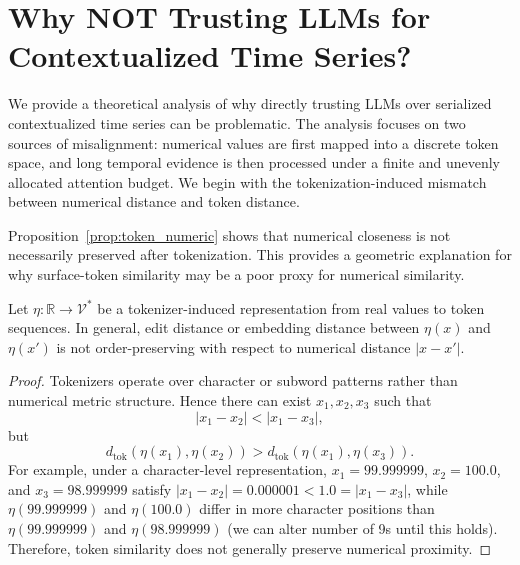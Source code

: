 \section{Why NOT Trusting LLMs for Contextualized Time Series?}
\label{ap:analysis}

We provide a theoretical analysis of why directly trusting LLMs over serialized
contextualized time series can be problematic. The analysis focuses on two
sources of misalignment: numerical values are first mapped into a discrete token
space, and long temporal evidence is then processed under a finite and unevenly
allocated attention budget. We begin with the tokenization-induced mismatch
between numerical distance and token distance.

Proposition~\ref{prop:token_numeric} shows that numerical closeness is not
necessarily preserved after tokenization. This provides a geometric explanation
for why surface-token similarity may be a poor proxy for numerical similarity.

\begin{proposition}
\label{prop:token_numeric}
Let $\eta:\mathbb{R}\rightarrow\mathcal{V}^*$ be a tokenizer-induced
representation from real values to token sequences. In general, edit distance or
embedding distance between $\eta(x)$ and $\eta(x')$ is not order-preserving with
respect to numerical distance $|x-x'|$.
\end{proposition}

\begin{proof}
Tokenizers operate over character or subword patterns rather than numerical
metric structure. Hence there can exist $x_1,x_2,x_3$ such that
\begin{equation}
    |x_1-x_2| < |x_1-x_3|,
\end{equation}
but
\begin{equation}
    d_{\mathrm{tok}}(\eta(x_1),\eta(x_2))
    >
    d_{\mathrm{tok}}(\eta(x_1),\eta(x_3)).
\end{equation}
For example, under a character-level representation,
$x_1=99.999999$, $x_2=100.0$, and $x_3=98.999999$ satisfy
$|x_1-x_2|=0.000001<1.0=|x_1-x_3|$, while $\eta(99.999999)$ and $\eta(100.0)$ differ in more character positions than $\eta(99.999999)$ and $\eta(98.999999)$ (we can alter number of 9s until this holds). Therefore, token similarity does not generally preserve numerical proximity.
\end{proof}

